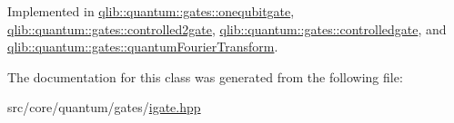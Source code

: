 Implemented in \hyperlink{classqlib_1_1quantum_1_1gates_1_1onequbitgate_a280c7a7d29032eeb95afcb3d6668e7db}{qlib\+::quantum\+::gates\+::onequbitgate}, \hyperlink{classqlib_1_1quantum_1_1gates_1_1controlled2gate_a272635da6a7b8f65379f6ecb42df9389}{qlib\+::quantum\+::gates\+::controlled2gate}, \hyperlink{classqlib_1_1quantum_1_1gates_1_1controlledgate_aec6e423cc6ae442c5c3c5dc04581959e}{qlib\+::quantum\+::gates\+::controlledgate}, and \hyperlink{classqlib_1_1quantum_1_1gates_1_1quantumFourierTransform_a81c62ab7b1edeeb2b01d5f9dacca2bae}{qlib\+::quantum\+::gates\+::quantum\+Fourier\+Transform}.



The documentation for this class was generated from the following file\+:\begin{DoxyCompactItemize}
\item 
src/core/quantum/gates/\hyperlink{igate_8hpp}{igate.\+hpp}\end{DoxyCompactItemize}
